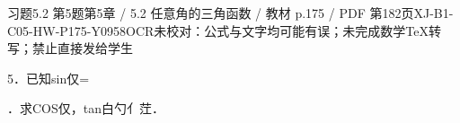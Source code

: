 \begin{bankitem}{习题5.2 第5题}{第5章 / 5.2 任意角的三角函数 / 教材 p.175 / PDF 第182页}{XJ-B1-C05-HW-P175-Y0958}{OCR未校对：公式与文字均可能有误；未完成数学TeX转写；禁止直接发给学生}
\begin{ocrdraft}
\par
5．已知sin仅=
\par
．求COS仅，tan白勺亻茳．
\end{ocrdraft}
\end{bankitem}
